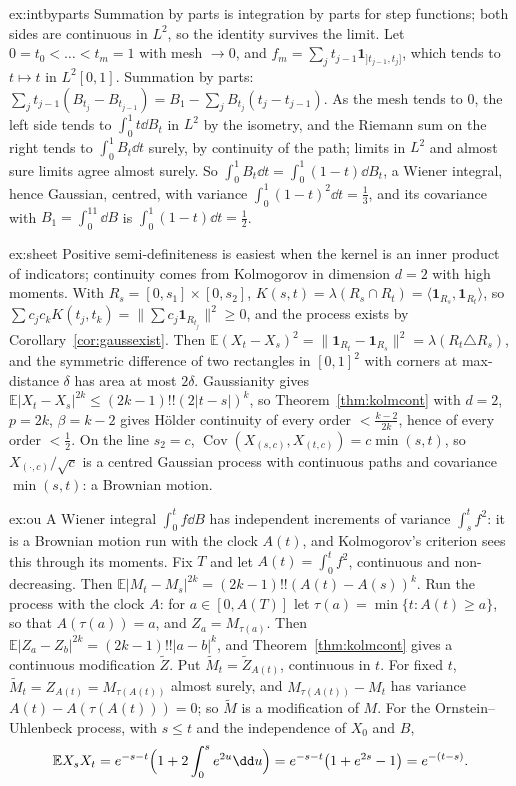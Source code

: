 \begin{solution}{ex:intbyparts}
\idea Summation by parts is integration by parts for step functions; both sides are continuous in $L^2$, so the identity survives the limit.
\writeup Let $0=t_0<\dots<t_m=1$ with mesh $\to0$, and $f_m=\sum_jt_{j-1}\mathbf 1_{]t_{j-1},t_j]}$, which tends to $t\mapsto t$ in $L^2[0,1]$. Summation by parts:
$\sum_jt_{j-1}(B_{t_j}-B_{t_{j-1}})=B_1-\sum_jB_{t_j}(t_j-t_{j-1})$. As the mesh tends to $0$, the left side tends to $\int_0^1t\dd B_t$ in $L^2$ by the isometry, and the Riemann sum on the right tends to
$\int_0^1B_t\dd t$ surely, by continuity of the path; limits in $L^2$ and almost sure limits agree almost surely. So $\int_0^1B_t\dd t=\int_0^1(1-t)\dd B_t$, a Wiener integral, hence Gaussian, centred, with variance
$\int_0^1(1-t)^2\dd t=\frac13$, and its covariance with $B_1=\int_0^11\dd B$ is $\int_0^1(1-t)\dd t=\frac12$.
\end{solution}

\begin{solution}{ex:sheet}
\idea Positive semi-definiteness is easiest when the kernel is an inner product of indicators; continuity comes from Kolmogorov in dimension $d=2$ with high moments.
\writeup With $R_s=[0,s_1]\times[0,s_2]$, $K(s,t)=\lambda(R_s\cap R_t)=\langle\mathbf 1_{R_s},\mathbf 1_{R_t}\rangle$, so $\sum c_jc_kK(t_j,t_k)=\|\sum c_j\mathbf 1_{R_{t_j}}\|^2\ge0$, and the process exists by
Corollary~\ref{cor:gaussexist}. Then $\mathbb E(X_t-X_s)^2=\|\mathbf 1_{R_t}-\mathbf 1_{R_s}\|^2=\lambda(R_t\triangle R_s)$, and the symmetric difference of two rectangles in $[0,1]^2$ with corners at max-distance $\delta$ has
area at most $2\delta$. Gaussianity gives $\mathbb E|X_t-X_s|^{2k}\le(2k-1)!!(2|t-s|)^k$, so Theorem~\ref{thm:kolmcont} with $d=2$, $p=2k$, $\beta=k-2$ gives H\"older continuity of every order $<\frac{k-2}{2k}$, hence of
every order $<\frac12$. On the line $s_2=c$, $\operatorname{Cov}(X_{(s,c)},X_{(t,c)})=c\min(s,t)$, so $X_{(\cdot,c)}/\sqrt c$ is a centred Gaussian process with continuous paths and covariance $\min(s,t)$: a Brownian motion.
\end{solution}

\begin{solution}{ex:ou}
\idea A Wiener integral $\int_0^tf\dd B$ has independent increments of variance $\int_s^tf^2$: it is a Brownian motion run with the clock $A(t)$, and Kolmogorov's criterion sees this through its moments.
\writeup Fix $T$ and let $A(t)=\int_0^tf^2$, continuous and non-decreasing. Then $\mathbb E|M_t-M_s|^{2k}=(2k-1)!!(A(t)-A(s))^k$. Run the process with the clock $A$: for $a\in[0,A(T)]$ let
$\tau(a)=\min\{t:A(t)\ge a\}$, so that $A(\tau(a))=a$, and $Z_a=M_{\tau(a)}$. Then $\mathbb E|Z_a-Z_b|^{2k}=(2k-1)!!|a-b|^k$, and Theorem~\ref{thm:kolmcont} gives a continuous modification $\tilde Z$. Put
$\tilde M_t=\tilde Z_{A(t)}$, continuous in $t$. For fixed $t$, $\tilde M_t=Z_{A(t)}=M_{\tau(A(t))}$ almost surely, and $M_{\tau(A(t))}-M_t$ has variance $A(t)-A(\tau(A(t)))=0$; so $\tilde M$ is a modification of $M$.
For the Ornstein--Uhlenbeck process, with $s\le t$ and the independence of $X_0$ and $B$,
\[
\mathbb E X_sX_t=e^{-s-t}\Bigl(1+2\int_0^se^{2u}\dd u\Bigr)=e^{-s-t}\bigl(1+e^{2s}-1\bigr)=e^{-(t-s)}.
\]
\end{solution}

